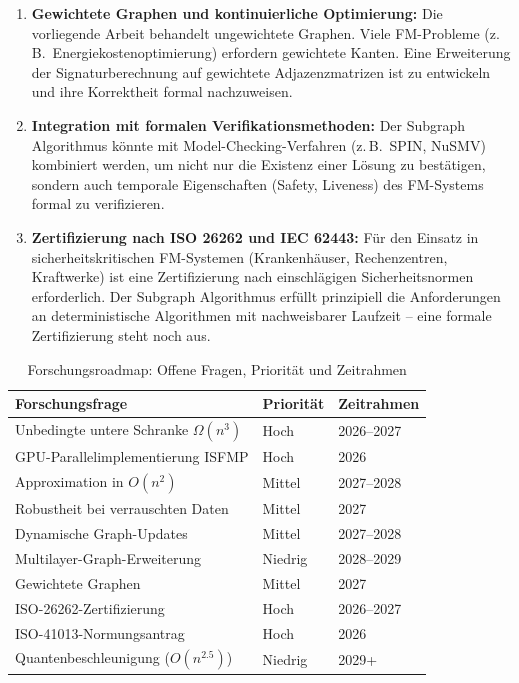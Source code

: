 ﻿\documentclass[a4paper,12pt]{article}
\theoremstyle{definition}
\begin{document}
\begin{enumerate}
\item \textbf{Gewichtete Graphen und kontinuierliche Optimierung:}
      Die vorliegende Arbeit behandelt ungewichtete Graphen.
      Viele FM-Probleme (z.\,B.\ Energiekostenoptimierung) erfordern gewichtete
      Kanten. Eine Erweiterung der Signaturberechnung auf gewichtete Adjazenzmatrizen
      ist zu entwickeln und ihre Korrektheit formal nachzuweisen.

\item \textbf{Integration mit formalen Verifikationsmethoden:}
      Der Subgraph Algorithmus könnte mit Model-Checking-Verfahren
      (z.\,B.\ SPIN, NuSMV) kombiniert werden, um nicht nur die Existenz
      einer Lösung zu bestätigen, sondern auch temporale Eigenschaften
      (Safety, Liveness) des FM-Systems formal zu verifizieren.

\item \textbf{Zertifizierung nach ISO 26262 und IEC 62443:}
      Für den Einsatz in sicherheitskritischen FM-Systemen (Krankenhäuser,
      Rechenzentren, Kraftwerke) ist eine Zertifizierung nach einschlägigen
      Sicherheitsnormen erforderlich. Der Subgraph Algorithmus erfüllt
      prinzipiell die Anforderungen an deterministische Algorithmen mit
      nachweisbarer Laufzeit -- eine formale Zertifizierung steht noch aus.

\end{enumerate}

\begin{table}[ht]
\centering
\caption{Forschungsroadmap: Offene Fragen, Priorität und Zeitrahmen}
\label{tab:roadmap}
\begin{tabular}{p{5.5cm} l l}
\toprule
\textbf{Forschungsfrage} & \textbf{Priorität} & \textbf{Zeitrahmen} \\
\midrule
Unbedingte untere Schranke $\Omega(n^3)$       & Hoch     & 2026--2027 \\
GPU-Parallelimplementierung ISFMP              & Hoch     & 2026       \\
Approximation in $O(n^2)$                     & Mittel   & 2027--2028 \\
Robustheit bei verrauschten Daten             & Mittel   & 2027       \\
Dynamische Graph-Updates                      & Mittel   & 2027--2028 \\
Multilayer-Graph-Erweiterung                  & Niedrig  & 2028--2029 \\
Gewichtete Graphen                            & Mittel   & 2027       \\
ISO-26262-Zertifizierung                      & Hoch     & 2026--2027 \\
ISO-41013-Normungsantrag                      & Hoch     & 2026       \\
Quantenbeschleunigung ($O(n^{2.5})$)          & Niedrig  & 2029+      \\
\bottomrule
\end{tabular}
\end{table}
\end{document}
